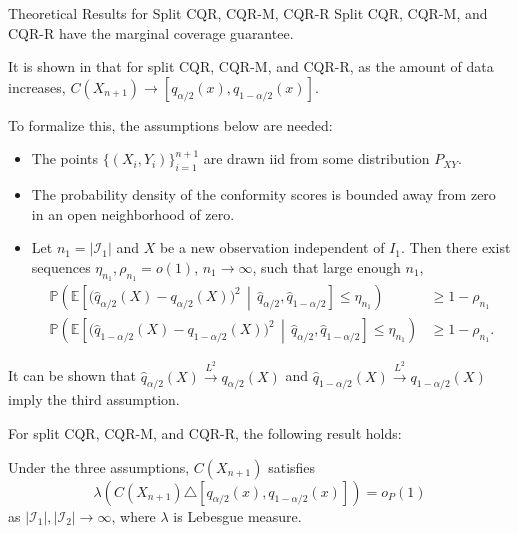 \documentclass{beamer}
\newcommand{\E}{\mathbb{E}}
\newcommand{\Prob}{\mathbb{P}}
\begin{document}
\begin{frame}[allowframebreaks]{Theoretical Results for Split CQR, CQR-M, CQR-R}
    Split CQR, CQR-M, and CQR-R have the marginal coverage guarantee.

    \medskip

    It is shown in \cite{sesia2020comp} that for split CQR, CQR-M, and CQR-R, as the amount of data increases, $C(X_{n + 1}) \to [q_{\alpha / 2}(x), q_{1 - \alpha / 2}(x)]$.

    \smallskip

    To formalize this, the assumptions below are needed:
    \begin{itemize}
        \item The points $\{(X_i, Y_i)\}_{i = 1}^{n + 1}$ are drawn iid from some distribution $P_{X Y}$. 
        \item The probability density of the conformity scores is bounded away from zero in an open neighborhood of zero.
        \item Let $n_1 = |\mathcal{I}_1|$ and $X$ be a new observation independent of $I_1$. Then there exist sequences $\eta_{n_1}, \rho_{n_1} = o(1)$, $n_1 \to \infty$, such that large enough $n_1$,
        \begin{align*}
            \Prob\left(
                \E\left[\bigl(\hat q_{\alpha/2}(X) - q_{\alpha/2}(X)\bigr)^2
                \,\middle|\, \hat q_{\alpha/2}, \hat q_{1-\alpha/2}\right]
                \le \eta_{n_1}
            \right) &\ge 1 - \rho_{n_1} \\
            \Prob\left(
                \E\left[\bigl(\hat q_{1-\alpha/2}(X) - q_{1-\alpha/2}(X)\bigr)^2
                \,\middle|\, \hat q_{\alpha/2}, \hat q_{1-\alpha/2}\right]
                \le \eta_{n_1}
            \right) &\ge 1 - \rho_{n_1}.
        \end{align*}
    \end{itemize}

    \framebreak

    It can be shown that $\hat q_{\alpha/2}(X) \xrightarrow{L^2} q_{\alpha/2}(X)$ and $\hat q_{1-\alpha/2}(X) \xrightarrow{L^2} q_{1-\alpha/2}(X)$ imply the third assumption.

    \medskip

    For split CQR, CQR-M, and CQR-R, the following result holds:
    \begin{theorem}
        Under the three assumptions, $C(X_{n + 1})$ satisfies
        \[
        \lambda(C(X_{n + 1}) \triangle [q_{\alpha / 2}(x), q_{1 - \alpha / 2}(x)]) = o_P(1)
        \]
        as $|\mathcal{I}_1|, |\mathcal{I}_2| \to \infty$, where $\lambda$ is Lebesgue measure.
    \end{theorem}


\end{frame}
\end{document}
